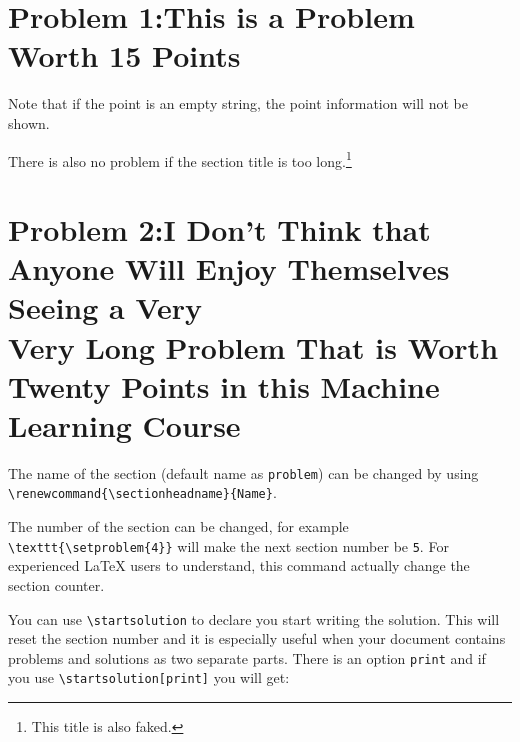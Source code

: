 \documentclass[twoside]{seu-ml-assign}
\renewcommand{\sectionheadname}{Section}
\begin{document}
      \renewcommand{\sectionheadname}{Problem}

      \section*{Problem 1:\hspace{0.33em}This is a Problem Worth 15 Points}
      Note that if the point is an empty string, the point information will not be shown.

      There is also no problem if the section title is too long.\footnote{This title is also faked.}\vspace{-8mm}

      \section*{Problem 2:\hspace{0.33em}I Don't Think that Anyone Will Enjoy Themselves Seeing a Very\\\hspace{5.2em}Very Long Problem That is Worth Twenty Points in this Machine\\\hspace{5.2em}Learning Course}

      \renewcommand{\sectionheadname}{Section}

      The name of the section (default name as \texttt{problem}) can be changed by using \verb|\renewcommand{\sectionheadname}{Name}|.

    The number of the section can be changed, for example \verb|\texttt{\setproblem{4}}| will make the next section number be \texttt{5}.
    For experienced \LaTeX{} users to understand, this command actually change the section counter.

    You can use \verb|\startsolution| to declare you start writing the solution.
    This will reset the section number and it is especially useful when your document contains problems and solutions as two separate parts.
    There is an option \texttt{print} and if you use \verb|\startsolution[print]| you will get:
    \vspace{-\baselineskip}
\end{document}
